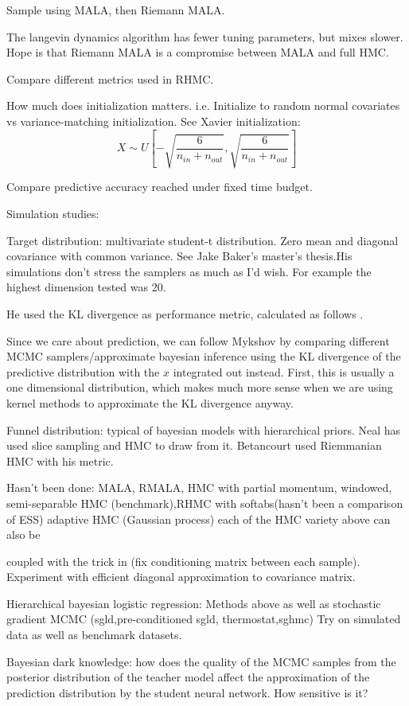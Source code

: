 \documentclass[12pt]{report}
\begin{document}
\begin{enumerate}
Sample using MALA, then Riemann MALA.

The langevin dynamics algorithm has fewer tuning parameters, but mixes slower. Hope is that Riemann MALA is a compromise between MALA and full HMC. 

Compare different metrics used in RHMC. 

How much does initialization matters. i.e. Initialize to random normal covariates vs variance-matching initialization. See Xavier initialization: 
\[X \sim U[- \sqrt{\frac{6}{n_{in}+n_{out}}}, \sqrt{\frac{6}{n_{in}+n_{out}}}] \]

Compare predictive accuracy reached under fixed time budget.

Simulation studies: 

Target distribution: multivariate student-t distribution. Zero mean and diagonal covariance with common variance. See Jake Baker's master's thesis.His simulations don't stress the samplers as much as I'd wish. For example the highest dimension tested was 20. 

He used the KL divergence as performance metric, calculated as follows \cite{boltz2007high}. 

Since we care about prediction, we can follow Mykshov by comparing different MCMC samplers/approximate bayesian inference using the KL divergence of the predictive distribution with the $x$ integrated out instead. First, this is usually a one dimensional distribution, which makes much more sense when we are using kernel methods to approximate the KL divergence anyway.

Funnel distribution: typical of bayesian models with hierarchical priors. Neal has used slice sampling and HMC to draw from it. Betancourt used Riemmanian HMC with his metric. 

Hasn't been done: MALA, RMALA, HMC with partial momentum, windowed,
semi-separable HMC (benchmark),RHMC with softabs(hasn't been a comparison of
ESS) adaptive HMC (Gaussian process) each of the HMC variety above can also be

coupled with the trick in \cite{burda2011bayesian} (fix conditioning matrix
between each sample).
Experiment with efficient diagonal approximation to covariance matrix.

Hierarchical bayesian logistic regression: Methods above as well as stochastic
gradient MCMC (sgld,pre-conditioned sgld, thermostat,sghmc)
Try on simulated data as well as benchmark datasets.


Bayesian dark knowledge: how does the quality of the MCMC samples from the
posterior distribution of the teacher model affect the approximation of the
prediction distribution by the student neural network. How sensitive is it?



\end{enumerate}
\end{document}
